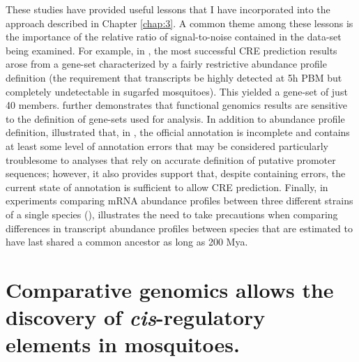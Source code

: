 These studies have provided useful lessons that I have incorporated into the approach described in Chapter \ref{chap:3}.
A common theme among these lessons is the importance of the relative ratio of signal-to-noise contained in the data-set being examined.
For example, in \citet{Bonizzoni2011}, the most successful \gls{CRE} prediction results arose from a gene-set characterized by a fairly restrictive abundance profile definition (the requirement that transcripts be highly detected at 5h PBM but completely undetectable in sugarfed mosquitoes).
This yielded a gene-set of just 40 members.
\citet{bonizzoni2012complex} further demonstrates that \gls{functional genomics} results are sensitive to the definition of gene-sets used for analysis.
In addition to abundance profile definition, \citet{Bonizzoni2011} illustrated that, in \Aa, the official annotation is incomplete and contains at least some level of annotation errors that may be considered particularly troublesome to analyses that rely on accurate definition of putative promoter sequences; however, it also provides support that, despite containing errors, the current state of annotation is sufficient to allow \gls{CRE} prediction.
Finally, in experiments comparing mRNA abundance profiles between three different strains of a single species (\Aa), \citet{bonizzoni2012strain} illustrates the need to take precautions when comparing differences in transcript abundance profiles between species that are estimated to have last shared a common ancestor as long as 200 \gls{Mya}.


\section{Comparative genomics allows the discovery of \textit{cis}-regulatory elements in mosquitoes. \cite{Sieglaff2009}}






